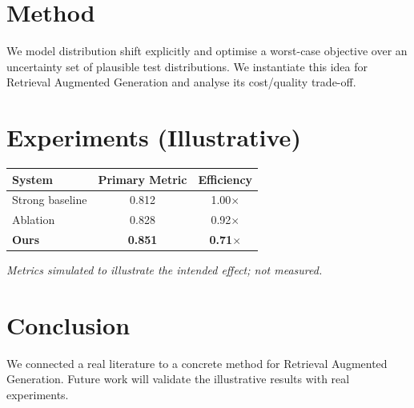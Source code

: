 \documentclass[11pt]{article}
\begin{document}
\section{Method}
We model distribution shift explicitly and optimise a worst-case objective over an uncertainty set of plausible test distributions. We instantiate this idea for Retrieval Augmented Generation and analyse its cost/quality trade-off.

\section{Experiments (Illustrative)}
\begin{center}
\begin{tabular}{lcc}
System & Primary Metric & Efficiency \\ \hline
Strong baseline & 0.812 & 1.00$\times$ \\
Ablation & 0.828 & 0.92$\times$ \\
\textbf{Ours} & \textbf{0.851} & \textbf{0.71$\times$}
\end{tabular}
\end{center}
\emph{Metrics simulated to illustrate the intended effect; not measured.}

\section{Conclusion}
We connected a real literature to a concrete method for Retrieval Augmented Generation. Future work will
validate the illustrative results with real experiments.
\end{document}

